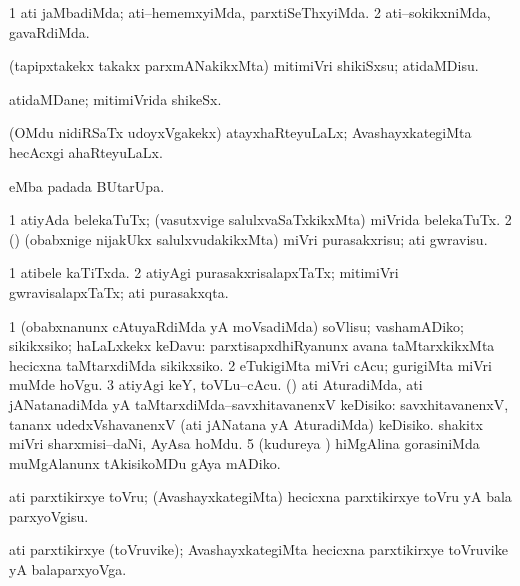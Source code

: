 \bentry
{}
\gl{\kirxvi}
\bmng
\bnum
\num{1} ati jaMbadiMda; ati--hememxyiMda, parxtiSeThxyiMda. 
\num{2} ati--sokikxniMda, gavaRdiMda. 
\enum
\emng
\eentry


\bentry
{}
\gl{\sakirx}
\bmng
(tapipxtakekx takakx parxmANakikxMta) mitimiVri shikiSxsu; atidaMDisu. 
\emng
\eentry


\bentry
{}
\gl{\nA}
\bmng
atidaMDane; mitimiVrida shikeSx. 
\emng
\eentry


\bentry
{}
\gl{\gu}
\bmng
(OMdu nidiRSaTx udoyxVgakekx) atayxhaRteyuLaLx; AvashayxkategiMta hecAcxgi ahaRteyuLaLx. 
\emng
\eentry


\bentry
{}
\gl{\kirx}
\bmng
{} eMba padada BUtarUpa. 
\emng
\eentry


\bentry
{}
\gl{\sakirx}
\bmng
\bnum
\num{1} atiyAda belekaTuTx; (vasutxvige salulxvaSaTxkikxMta) miVrida belekaTuTx. 
\num{2} (\rUpa) (obabxnige nijakUkx salulxvudakikxMta) miVri purasakxrisu; ati gwravisu. 
\enum
\emng
\eentry


\bentry
{}
\gl{\gu}
\bmng
\bnum
\num{1} atibele kaTiTxda. 
\num{2} atiyAgi purasakxrisalapxTaTx; mitimiVri gwravisalapxTaTx; ati purasakxqta. 
\enum
\emng
\eentry


\bentry
{}
\gl{\sakirx}
\bmng
\bnum
\num{1} (obabxnanunx cAtuyaRdiMda yA moVsadiMda) soVlisu; vashamADiko; sikikxsiko; haLaLxkekx keDavu:  parxtisapxdhiRyanunx avana taMtarxkikxMta hecicxna taMtarxdiMda sikikxsiko. 
\num{2} eTukigiMta miVri cAcu; gurigiMta miVri muMde hoVgu. 
\num{3} atiyAgi keY, toVLu--cAcu. 
 (\AtAmx) ati AturadiMda, ati jANatanadiMda yA taMtarxdiMda--savxhitavanenxV keDisiko:  
\banum
{} savxhitavanenxV, tananx udedxVshavanenxV (ati jANatana yA AturadiMda) keDisiko. 
 shakitx miVri sharxmisi--daNi, AyAsa hoMdu. 
\eanum
\numie
\num{5} (kudureya \vi) hiMgAlina gorasiniMda muMgAlanunx tAkisikoMDu gAya mADiko. 
\enum
\emng
\eentry


\bentry
{}
\gl{\akirx}
\bmng
ati parxtikirxye toVru; (AvashayxkategiMta) hecicxna parxtikirxye toVru yA bala parxyoVgisu. 
\emng
\eentry


\bentry
{}
\gl{\nA}
\bmng
ati parxtikirxye (toVruvike); AvashayxkategiMta hecicxna parxtikirxye toVruvike yA balaparxyoVga. 
\emng
\eentry


